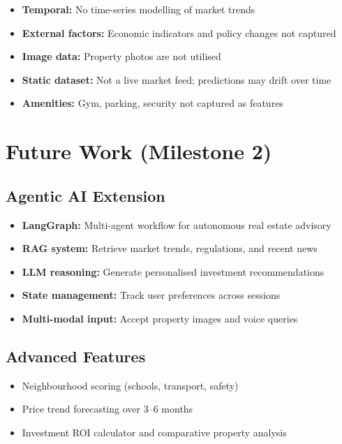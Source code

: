 \documentclass[12pt,a4paper]{article}
\begin{document}
\begin{itemize}
  \item \textbf{Temporal:} No time-series modelling of market trends
  \item \textbf{External factors:} Economic indicators and policy changes not captured
  \item \textbf{Image data:} Property photos are not utilised
  \item \textbf{Static dataset:} Not a live market feed; predictions may drift over time
  \item \textbf{Amenities:} Gym, parking, security not captured as features
\end{itemize}

\section{Future Work (Milestone 2)}

\subsection{Agentic AI Extension}
\begin{itemize}
  \item \textbf{LangGraph:} Multi-agent workflow for autonomous real estate advisory
  \item \textbf{RAG system:} Retrieve market trends, regulations, and recent news
  \item \textbf{LLM reasoning:} Generate personalised investment recommendations
  \item \textbf{State management:} Track user preferences across sessions
  \item \textbf{Multi-modal input:} Accept property images and voice queries
\end{itemize}

\subsection{Advanced Features}
\begin{itemize}
  \item Neighbourhood scoring (schools, transport, safety)
  \item Price trend forecasting over 3--6 months
  \item Investment ROI calculator and comparative property analysis
\end{itemize}
\end{document}
